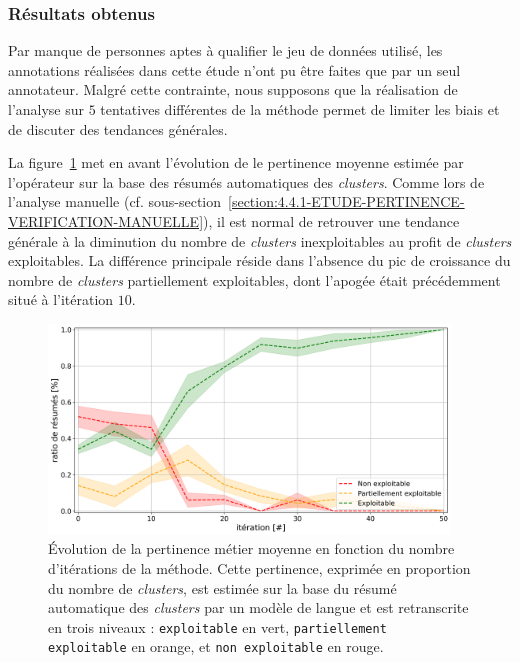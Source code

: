 		\subsubsection{Résultats obtenus}
			
			\begin{leftBarWarning}
				Par manque de personnes aptes à qualifier le jeu de données utilisé, les annotations réalisées dans cette étude n'ont pu être faites que par un seul annotateur.
				Malgré cette contrainte, nous supposons que la réalisation de l'analyse sur $5$ tentatives différentes de la méthode permet de limiter les biais et de discuter des tendances générales.
			\end{leftBarWarning}
		
			La figure~\ref{figure:4.4.3-ETUDE-PERTINENCE-RESUME-AUTOMATIQUE} met en avant l'évolution de le pertinence moyenne estimée par l'opérateur sur la base des résumés automatiques des \textit{clusters}.
			Comme lors de l'analyse manuelle (cf. sous-section~\ref{section:4.4.1-ETUDE-PERTINENCE-VERIFICATION-MANUELLE}), il est normal de retrouver une tendance générale à la diminution du nombre de \textit{clusters} inexploitables au profit de \textit{clusters} exploitables.
			La différence principale réside dans l'absence du pic de croissance du nombre de \textit{clusters} partiellement exploitables, dont l'apogée était précédemment situé à l'itération $10$.
			
			\begin{figure}[!htb]
				\centering
				\includegraphics[width=0.95\textwidth]{figures/etude-pertinence-llm-check-resume-annotation-favori}
				\caption{Évolution de la pertinence métier moyenne en fonction du nombre d'itérations de la méthode.
				Cette pertinence, exprimée en proportion du nombre de \textit{clusters}, est estimée sur la base du résumé automatique des \textit{clusters} par un modèle de langue et est retranscrite en trois niveaux : \texttt{exploitable} en vert, \texttt{partiellement exploitable} en orange, et \texttt{non exploitable} en rouge.}
				\label{figure:4.4.3-ETUDE-PERTINENCE-RESUME-AUTOMATIQUE}
			\end{figure}
			

